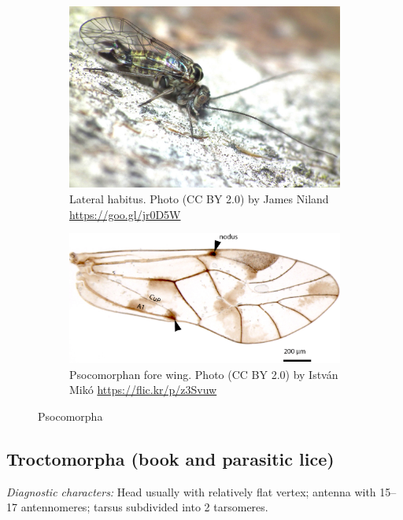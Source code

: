 \documentclass[letterpaper, 11pt]{article}
\begin{document}
\begin{figure}[ht!]
 \centering
 \begin{subfigure}[ht!]{0.45\textwidth}
  \includegraphics[width=\textwidth]{PsocidHabitus}
  \caption{Lateral habitus. Photo (CC BY 2.0) by James Niland \url{https://goo.gl/jr0D5W}}
  \label{fig:psocid}
 \end{subfigure}
 \qquad
 \begin{subfigure}[ht!]{0.45\textwidth}
  \includegraphics[width=\textwidth]{PsocidWing}
  \caption{Psocomorphan fore wing. Photo (CC BY 2.0) by Istv\'an Mik\'o \url{https://flic.kr/p/z3Svuw}}
  \label{fig:psocidwing}
 \end{subfigure}
 \caption{Psocomorpha}\label{fig:psocids}
\end{figure}

\subsection{Troctomorpha (book and parasitic lice)}
\noindent{}\textit{Diagnostic characters:} Head usually with relatively flat vertex; antenna with 15--17 antennomeres; tarsus subdivided into 2 tarsomeres.\\
\end{document}
